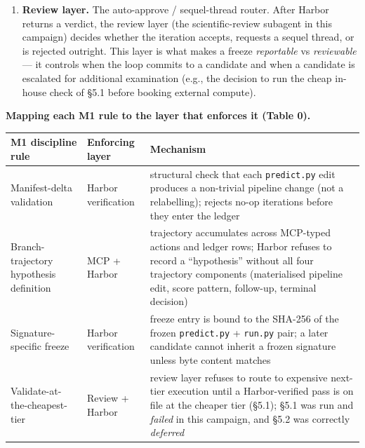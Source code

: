 \documentclass[11pt,letterpaper]{report}
\begin{document}
\begin{enumerate}[leftmargin=1.6em,itemsep=0.25em]
\item \textbf{Review layer.} The auto-approve / sequel-thread router. After Harbor returns a verdict, the review layer (the scientific-review subagent in this campaign) decides whether the iteration accepts, requests a sequel thread, or is rejected outright. This layer is what makes a freeze \emph{reportable} vs \emph{reviewable} --- it controls when the loop commits to a candidate and when a candidate is escalated for additional examination (e.g., the decision to run the cheap in-house check of \S5.1 before booking external compute).
\end{enumerate}

\textbf{Mapping each M1 rule to the layer that enforces it (Table 0).}

{}
\begin{center}
\small
\setlength{\tabcolsep}{4pt}
\renewcommand{\arraystretch}{1.15}
\begin{tabularx}{\textwidth}{@{}>{\raggedright\arraybackslash}p{}>{\raggedright\arraybackslash}p{}>{\raggedright\arraybackslash}X@{}}
\toprule
\textbf{M1 discipline rule} & \textbf{Enforcing layer} & \textbf{Mechanism} \\
\midrule
Manifest-delta validation & Harbor verification & structural check that each \texttt{predict.py} edit produces a non-trivial pipeline change (not a relabelling); rejects no-op iterations before they enter the ledger \\
\midrule
Branch-trajectory hypothesis definition & MCP + Harbor & trajectory accumulates across MCP-typed actions and ledger rows; Harbor refuses to record a ``hypothesis'' without all four trajectory components (materialised pipeline edit, score pattern, follow-up, terminal decision) \\
\midrule
Signature-specific freeze & Harbor verification & freeze entry is bound to the SHA-256 of the frozen \texttt{predict.py} + \texttt{run.py} pair; a later candidate cannot inherit a frozen signature unless byte content matches \\
\midrule
Validate-at-the-cheapest-tier & Review + Harbor & review layer refuses to route to expensive next-tier execution until a Harbor-verified pass is on file at the cheaper tier (\S5.1); \S5.1 was run and \emph{failed} in this campaign, and \S5.2 was correctly \emph{deferred} \\
\bottomrule
\end{tabularx}
\end{center}
\end{document}
